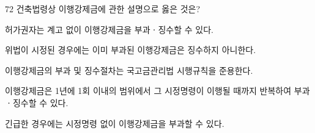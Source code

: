 \begin{question}{72}
건축법령상 이행강제금에 관한 설명으로 옳은 것은?
\begin{choices}
  \item 허가권자는 계고 없이 이행강제금을 부과ㆍ징수할 수 있다.
  \item 위법이 시정된 경우에는 이미 부과된 이행강제금은 징수하지 아니한다.
  \item 이행강제금의 부과 및 징수절차는 국고금관리법 시행규칙을 준용한다.
  \item 이행강제금은 1년에 1회 이내의 범위에서 그 시정명령이 이행될 때까지 반복하여 부과ㆍ징수할 수 있다.
  \item 긴급한 경우에는 시정명령 없이 이행강제금을 부과할 수 있다.
\end{choices}
\end{question}

